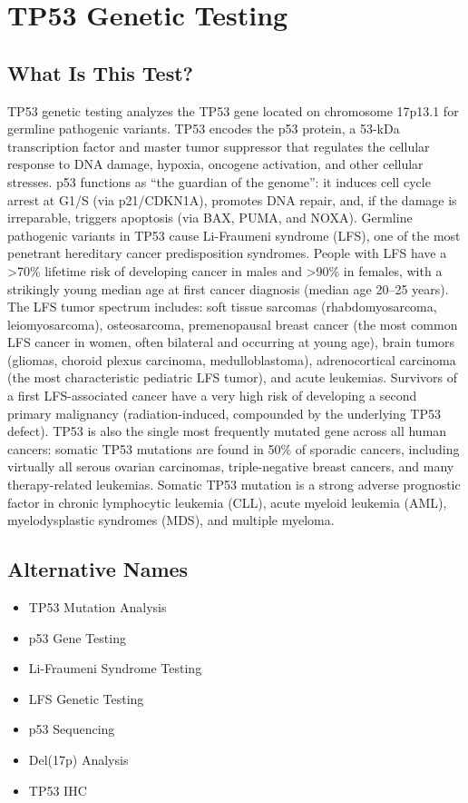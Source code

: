 \chapter{TP53 Genetic Testing}

\section*{What Is This Test?}
TP53 genetic testing analyzes the TP53 gene located on chromosome 17p13.1 for germline pathogenic variants. TP53 encodes the p53 protein, a 53-kDa transcription factor and master tumor suppressor that regulates the cellular response to DNA damage, hypoxia, oncogene activation, and other cellular stresses. p53 functions as ``the guardian of the genome'': it induces cell cycle arrest at G1/S (via p21/CDKN1A), promotes DNA repair, and, if the damage is irreparable, triggers apoptosis (via BAX, PUMA, and NOXA). Germline pathogenic variants in TP53 cause Li-Fraumeni syndrome (LFS), one of the most penetrant hereditary cancer predisposition syndromes. People with LFS have a >70\% lifetime risk of developing cancer in males and >90\% in females, with a strikingly young median age at first cancer diagnosis (median age 20--25 years). The LFS tumor spectrum includes: soft tissue sarcomas (rhabdomyosarcoma, leiomyosarcoma), osteosarcoma, premenopausal breast cancer (the most common LFS cancer in women, often bilateral and occurring at young age), brain tumors (gliomas, choroid plexus carcinoma, medulloblastoma), adrenocortical carcinoma (the most characteristic pediatric LFS tumor), and acute leukemias. Survivors of a first LFS-associated cancer have a very high risk of developing a second primary malignancy (radiation-induced, compounded by the underlying TP53 defect). TP53 is also the single most frequently mutated gene across all human cancers: somatic TP53 mutations are found in 50\% of sporadic cancers, including virtually all serous ovarian carcinomas, triple-negative breast cancers, and many therapy-related leukemias. Somatic TP53 mutation is a strong adverse prognostic factor in chronic lymphocytic leukemia (CLL), acute myeloid leukemia (AML), myelodysplastic syndromes (MDS), and multiple myeloma.

\section*{Alternative Names}
\begin{itemize}
  \item TP53 Mutation Analysis
  \item p53 Gene Testing
  \item Li-Fraumeni Syndrome Testing
  \item LFS Genetic Testing
  \item p53 Sequencing
  \item Del(17p) Analysis
  \item TP53 IHC
\end{itemize}
